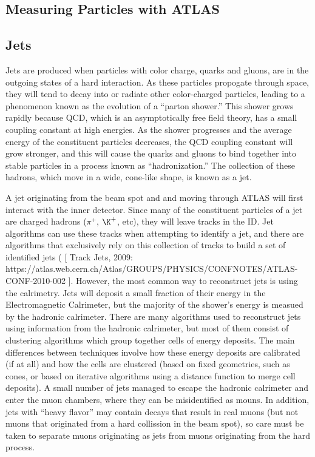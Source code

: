 \subsection{Measuring Particles with ATLAS}

\subsection{Jets}
Jets are produced when particles with color charge, quarks and gluons, are in the outgoing states of a hard interaction.
As these particles propogate through space, they will tend to decay into or radiate other color-charged particles, leading to a phenomenon known as the evolution of a ``parton shower.''
This shower grows rapidly because QCD, which is an asymptotically free field theory, has a small coupling constant at high energies.  
As the shower progresses and the average energy of the constituent particles decreases, the QCD coupling constant will grow stronger, and this will cause the quarks and gluons to bind together into stable particles in a process known as ``hadronization.''
The collection of these hadrons, which move in a wide, cone-like shape, is known as a jet.

A jet originating from the beam spot and and moving through ATLAS will first interact with the inner detector.  Since many of the constituent particles of a jet are charged hadrons ($\pi^{+}$, $\K^{+}$, etc), they will leave tracks in the ID.
Jet algorithms can use these tracks when attempting to identify a jet, and there are algorithms that exclusively rely on this collection of tracks to build a set of identified jets (
[ Track Jets, 2009: https://atlas.web.cern.ch/Atlas/GROUPS/PHYSICS/CONFNOTES/ATLAS-CONF-2010-002 ].
However, the most common way to reconstruct jets is using the calrimetry.
Jets will deposit a small fraction of their energy in the Electromagnetic Calrimeter, but the majority of the shower's energy is measued by the hadronic calrimeter.
There are many algorithms used to reconstruct jets using information from the hadronic calrimeter, but most of them consist of clustering algorithms which group together cells of energy deposits.
The main differences between techniques involve how these energy deposits are calibrated (if at all) and how the cells are clustered (based on fixed geometries, such as cones, or based on iterative algorithms using a distance function to merge cell deposits).
A small number of jets managed to escape the hadronic calrimeter and enter the muon chambers, where they can be misidentified as mouns.
In addition, jets with ``heavy flavor'' may contain decays that result in real muons (but not muons that originated from a hard collission in the beam spot), so care must be taken to separate muons originating as jets from muons originating from the hard process.

